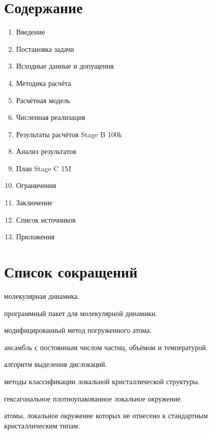 \documentclass[14pt,a4paper]{extarticle}
\begin{document}
\newpage

\section*{Содержание}
\begin{enumerate}[leftmargin=2.2em,itemsep=0pt]
\item Введение
\item Постановка задачи
\item Исходные данные и допущения
\item Методика расчёта
\item Расчётная модель
\item Численная реализация
\item Результаты расчётов Stage B 100k
\item Анализ результатов
\item План Stage C 1M
\item Ограничения
\item Заключение
\item Список источников
\item Приложения
\end{enumerate}
\newpage

\section*{Список сокращений}
\begin{description}[leftmargin=0pt,labelsep=0.8em,itemsep=2pt,font=\normalfont\bfseries]
\item[MD —] молекулярная динамика.
\item[LAMMPS —] программный пакет для молекулярной динамики.
\item[MEAM —] модифицированный метод погруженного атома.
\item[NVT —] ансамбль с постоянным числом частиц, объёмом и температурой.
\item[DXA —] алгоритм выделения дислокаций.
\item[CNA/PTM —] методы классификации локальной кристаллической структуры.
\item[HCP —] гексагональное плотноупакованное локальное окружение.
\item[OTHER —] атомы, локальное окружение которых не отнесено к стандартным кристаллическим типам.
\end{description}
\newpage
\end{document}
